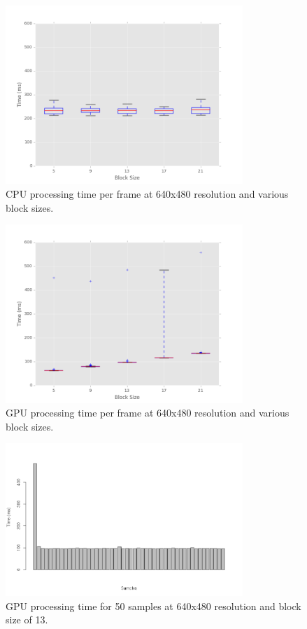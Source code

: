 \documentclass[12pt,letterpaper]{article}
\begin{document}
\begin{figure}[H]
  \centering
    \includegraphics[width=0.8\textwidth]{img/cpu_blocksize.png}
  \caption{CPU processing time per frame at 640x480 resolution and various block sizes.}
  \label{fig:cpublock}
\end{figure}

\begin{figure}[H]
  \centering
    \includegraphics[width=0.8\textwidth]{img/gpu_blocksize.png}
  \caption{GPU processing time per frame at 640x480 resolution and various block sizes.}
  \label{fig:gpublock}
\end{figure}

\begin{figure}[H]
  \centering
    \includegraphics[width=0.8\textwidth]{img/cudaloading.png}
  \caption{GPU processing time for 50 samples at 640x480 resolution and block size of 13.}
  \label{fig:cudaload}
\end{figure}
\end{document}
